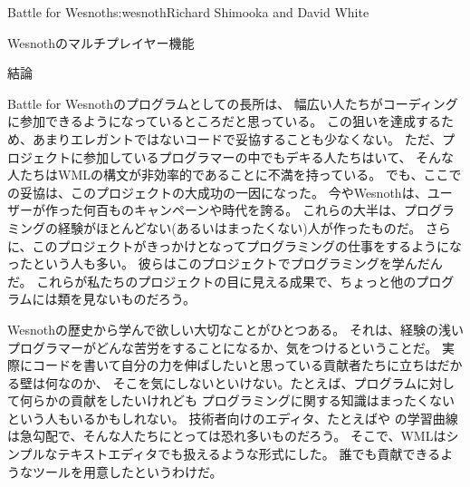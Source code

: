 \begin{aosachapter}{Battle for Wesnoth}{s:wesnoth}{Richard Shimooka and David White}
\begin{aosasect1}{Wesnothのマルチプレイヤー機能}
\end{aosasect1}

\begin{aosasect1}{結論}

Battle for Wesnothのプログラムとしての長所は、
幅広い人たちがコーディングに参加できるようになっているところだと思っている。
この狙いを達成するため、あまりエレガントではないコードで妥協することも少なくない。
ただ、プロジェクトに参加しているプログラマーの中でもデキる人たちはいて、
そんな人たちはWMLの構文が非効率的であることに不満を持っている。
でも、ここでの妥協は、このプロジェクトの大成功の一因になった。
今やWesnothは、ユーザーが作った何百ものキャンペーンや時代を誇る。
これらの大半は、プログラミングの経験がほとんどない(あるいはまったくない)人が作ったものだ。
さらに、このプロジェクトがきっかけとなってプログラミングの仕事をするようになったという人も多い。
彼らはこのプロジェクトでプログラミングを学んだんだ。
これらが私たちのプロジェクトの目に見える成果で、ちょっと他のプログラムには類を見ないものだろう。

Wesnothの歴史から学んで欲しい大切なことがひとつある。
それは、経験の浅いプログラマーがどんな苦労をすることになるか、気をつけるということだ。
実際にコードを書いて自分の力を伸ばしたいと思っている貢献者たちに立ちはだかる壁は何なのか、
そこを気にしないといけない。たとえば、プログラムに対して何らかの貢献をしたいけれども
プログラミングに関する知識はまったくないという人もいるかもしれない。
技術者向けのエディタ、たとえばや
の学習曲線は急勾配で、そんな人たちにとっては恐れ多いものだろう。
そこで、WMLはシンプルなテキストエディタでも扱えるような形式にした。
誰でも貢献できるようなツールを用意したというわけだ。


\end{aosasect1}
\end{aosachapter}
